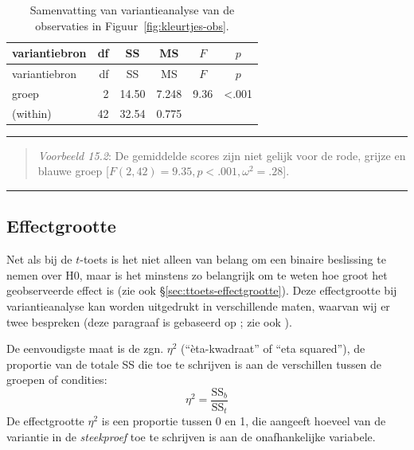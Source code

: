 \documentclass[
]{book}
\begin{document}
\begin{longtable}[]{@{}lrcccc@{}}
\caption{\label{tab:kleurtjes-anova} Samenvatting van variantieanalyse van de observaties in Figuur~\ref{fig:kleurtjes-obs}.}\tabularnewline
\toprule\noalign{}
variantiebron & df & SS & MS & \(F\) & \(p\) \\
\midrule\noalign{}
\endfirsthead
\toprule\noalign{}
variantiebron & df & SS & MS & \(F\) & \(p\) \\
\midrule\noalign{}
\endhead
\bottomrule\noalign{}
\endlastfoot
groep & 2 & 14.50 & 7.248 & 9.36 & \textless.001 \\
(within) & 42 & 32.54 & 0.775 & & \\
\end{longtable}

\begin{center}\rule{0.5\linewidth}{0.5pt}\end{center}

\begin{quote}
\emph{Voorbeeld 15.2}:
De gemiddelde scores zijn niet gelijk voor de rode, grijze en blauwe groep
{[}\(F(2,42) = 9.35, p<.001, \omega^2 = .28\){]}.
\end{quote}

\begin{center}\rule{0.5\linewidth}{0.5pt}\end{center}

\subsection{Effectgrootte}\label{sec:anova-oneway-effectgrootte}

Net als bij de \(t\)-toets is het niet alleen van belang om een binaire beslissing
te nemen over H0, maar is het minstens zo belangrijk om te weten hoe
groot het geobserveerde effect is (zie ook
§\ref{sec:ttoets-effectgrootte}). Deze effectgrootte bij
variantieanalyse kan worden uitgedrukt in verschillende maten, waarvan
wij er twee bespreken (deze paragraaf is gebaseerd op \citet{KL00}; zie ook \citet{Olej03}).

De eenvoudigste maat is de zgn. \(\eta^2\) (``èta-kwadraat'' of ``eta
squared''), de proportie van de totale SS die toe te schrijven is aan de
verschillen tussen de groepen of condities: \[\label{eq:etasq}
    \eta^2 = \frac{ \textrm{SS}_b } { \textrm{SS}_t }\] De effectgrootte
\(\eta^2\) is een proportie tussen 0 en 1, die aangeeft hoeveel van de
variantie in de \emph{steekproef} toe te schrijven is aan de onafhankelijke
variabele.
\end{document}
